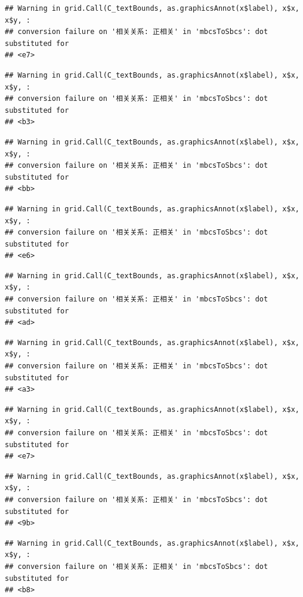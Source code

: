 \documentclass[
]{book}
\begin{document}
\begin{verbatim}
## Warning in grid.Call(C_textBounds, as.graphicsAnnot(x$label), x$x, x$y, :
## conversion failure on '相关关系: 正相关' in 'mbcsToSbcs': dot substituted for
## <e7>
\end{verbatim}

\begin{verbatim}
## Warning in grid.Call(C_textBounds, as.graphicsAnnot(x$label), x$x, x$y, :
## conversion failure on '相关关系: 正相关' in 'mbcsToSbcs': dot substituted for
## <b3>
\end{verbatim}

\begin{verbatim}
## Warning in grid.Call(C_textBounds, as.graphicsAnnot(x$label), x$x, x$y, :
## conversion failure on '相关关系: 正相关' in 'mbcsToSbcs': dot substituted for
## <bb>
\end{verbatim}

\begin{verbatim}
## Warning in grid.Call(C_textBounds, as.graphicsAnnot(x$label), x$x, x$y, :
## conversion failure on '相关关系: 正相关' in 'mbcsToSbcs': dot substituted for
## <e6>
\end{verbatim}

\begin{verbatim}
## Warning in grid.Call(C_textBounds, as.graphicsAnnot(x$label), x$x, x$y, :
## conversion failure on '相关关系: 正相关' in 'mbcsToSbcs': dot substituted for
## <ad>
\end{verbatim}

\begin{verbatim}
## Warning in grid.Call(C_textBounds, as.graphicsAnnot(x$label), x$x, x$y, :
## conversion failure on '相关关系: 正相关' in 'mbcsToSbcs': dot substituted for
## <a3>
\end{verbatim}

\begin{verbatim}
## Warning in grid.Call(C_textBounds, as.graphicsAnnot(x$label), x$x, x$y, :
## conversion failure on '相关关系: 正相关' in 'mbcsToSbcs': dot substituted for
## <e7>
\end{verbatim}

\begin{verbatim}
## Warning in grid.Call(C_textBounds, as.graphicsAnnot(x$label), x$x, x$y, :
## conversion failure on '相关关系: 正相关' in 'mbcsToSbcs': dot substituted for
## <9b>
\end{verbatim}

\begin{verbatim}
## Warning in grid.Call(C_textBounds, as.graphicsAnnot(x$label), x$x, x$y, :
## conversion failure on '相关关系: 正相关' in 'mbcsToSbcs': dot substituted for
## <b8>
\end{verbatim}
\end{document}
